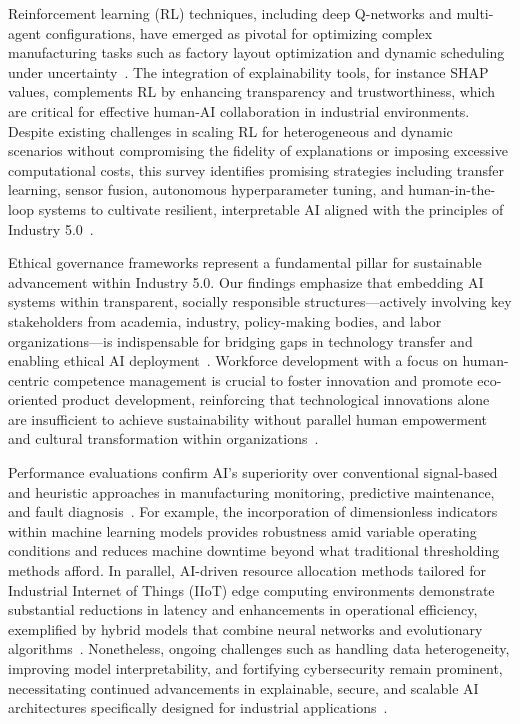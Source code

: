 \documentclass[sigconf]{acmart}
\begin{document}
Reinforcement learning (RL) techniques, including deep Q-networks and multi-agent configurations, have emerged as pivotal for optimizing complex manufacturing tasks such as factory layout optimization and dynamic scheduling under uncertainty~\cite{ref5,ref30}. The integration of explainability tools, for instance SHAP values, complements RL by enhancing transparency and trustworthiness, which are critical for effective human-AI collaboration in industrial environments. Despite existing challenges in scaling RL for heterogeneous and dynamic scenarios without compromising the fidelity of explanations or imposing excessive computational costs, this survey identifies promising strategies including transfer learning, sensor fusion, autonomous hyperparameter tuning, and human-in-the-loop systems to cultivate resilient, interpretable AI aligned with the principles of Industry 5.0~\cite{ref5,ref30,ref35,ref36}.

Ethical governance frameworks represent a fundamental pillar for sustainable advancement within Industry 5.0. Our findings emphasize that embedding AI systems within transparent, socially responsible structures—actively involving key stakeholders from academia, industry, policy-making bodies, and labor organizations—is indispensable for bridging gaps in technology transfer and enabling ethical AI deployment~\cite{ref3,ref25,ref38}. Workforce development with a focus on human-centric competence management is crucial to foster innovation and promote eco-oriented product development, reinforcing that technological innovations alone are insufficient to achieve sustainability without parallel human empowerment and cultural transformation within organizations~\cite{ref19,ref21,ref14}.

Performance evaluations confirm AI's superiority over conventional signal-based and heuristic approaches in manufacturing monitoring, predictive maintenance, and fault diagnosis~\cite{ref4,ref24,ref32}. For example, the incorporation of dimensionless indicators within machine learning models provides robustness amid variable operating conditions and reduces machine downtime beyond what traditional thresholding methods afford. In parallel, AI-driven resource allocation methods tailored for Industrial Internet of Things (IIoT) edge computing environments demonstrate substantial reductions in latency and enhancements in operational efficiency, exemplified by hybrid models that combine neural networks and evolutionary algorithms~\cite{ref31,ref34}. Nonetheless, ongoing challenges such as handling data heterogeneity, improving model interpretability, and fortifying cybersecurity remain prominent, necessitating continued advancements in explainable, secure, and scalable AI architectures specifically designed for industrial applications~\cite{ref29,ref35,ref39}.
\end{document}
